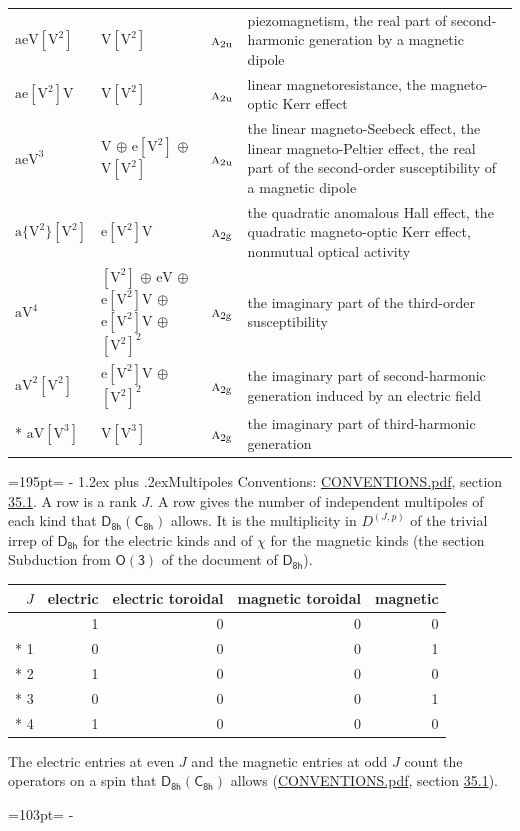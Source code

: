 \documentclass[10pt,a4paper]{article}
\makeatletter
\renewcommand\section{\@startsection{section}{1}{\z@}{-3ex plus -1ex minus -.2ex}%
  {1.2ex plus .2ex}{\normalfont\large\sffamily\bfseries\color{parttitle}}}
\newcommand{\needspace}[1]{\par\penalty-100\begingroup\dimen0=#1\relax\dimen2=\pagegoal
  \advance\dimen2-\pagetotal\ifdim\dimen0>\dimen2\relax\ifdim\dimen2>0pt\vfil\break\fi\fi
  \endgroup}
\numberwithin{equation}{section}
\newcommand{\grp}[1]{\mathsf{#1}}
\newcommand{\irr}[1]{\text{\normalfont\scshape #1}}
\newcommand{\ptag}[1]{\mathrm{#1}}
\newcommand{\irrJp}[2]{D^{(#1,#2)}}
\newcommand{\jahn}[1]{\mathrm{#1}}
\newlength{\fillwidth}\newlength{\cellwidth}\newlength{\colwidth}
\makeatother
\begin{document}
{\begin{longtable}{@{}lll>{\RaggedRight\arraybackslash}p{\fillwidth}@{}}
$\jahn{aeV[V^{2}]}$ & $\jahn{V[V^{2}]}$ & $\irr{a}_{2\ptag{u}}$ & piezomagnetism, the real part of second-harmonic generation by a magnetic dipole\\
$\jahn{ae[V^{2}]V}$ & $\jahn{V[V^{2}]}$ & $\irr{a}_{2\ptag{u}}$ & linear magnetoresistance, the magneto-optic Kerr effect\\
$\jahn{aeV^{3}}$ & $\jahn{V}$ $\oplus$ $\jahn{e[V^{2}]}$ $\oplus$ $\jahn{V[V^{2}]}$ & $\irr{a}_{2\ptag{u}}$ & the linear magneto-Seebeck effect, the linear magneto-Peltier effect, the real part of the second-order susceptibility of a magnetic dipole\\
$\jahn{a\{V^{2}\}[V^{2}]}$ & $\jahn{e[V^{2}]V}$ & $\irr{a}_{2\ptag{g}}$ & the quadratic anomalous Hall effect, the quadratic magneto-optic Kerr effect, nonmutual optical activity\\
$\jahn{aV^{4}}$ & $\jahn{[V^{2}]}$ $\oplus$ $\jahn{eV}$ $\oplus$ $\jahn{e[V^{2}]V}$ $\oplus$ $\jahn{e[V^{2}]V}$ $\oplus$ $\jahn{[V^{2}]^{2}}$ & $\irr{a}_{2\ptag{g}}$ & the imaginary part of the third-order susceptibility\\
$\jahn{aV^{2}[V^{2}]}$ & $\jahn{e[V^{2}]V}$ $\oplus$ $\jahn{[V^{2}]^{2}}$ & $\irr{a}_{2\ptag{g}}$ & the imaginary part of second-harmonic generation induced by an electric field\\*
$\jahn{aV[V^{3}]}$ & $\jahn{V[V^{3}]}$ & $\irr{a}_{2\ptag{g}}$ & the imaginary part of third-harmonic generation\\
\bottomrule\end{longtable}}
\needspace{195pt}
\section{Multipoles}\label{s:multipoles}
Conventions: \href{../../CONVENTIONS.pdf}{CONVENTIONS.pdf}, section \href{../../CONVENTIONS.pdf\#conv.35.1}{35.1}.
A row is a rank $J$. \label{n:head.multipole.electric}\label{n:head.multipole.electric.toroidal}\label{n:head.multipole.magnetic.toroidal}\label{n:head.multipole.magnetic}A row gives the number of independent multipoles of each kind that $\grp{D_{8h}}(\grp{C_{8h}})$ allows. It is the multiplicity in $\irrJp{J}{p}$ of the trivial irrep of $\grp{D_{8h}}$ for the electric kinds and of $\chi$ for the magnetic kinds (the section Subduction from $\grp{O(3)}$ of the document of \href{../../../rotation/data/pdf/D8h.pdf}{$\grp{D_{8h}}$}).
{\small\begin{longtable}{@{}rrrrr@{}}\toprule
$J$ & electric & electric toroidal & magnetic toroidal & magnetic\\\midrule\endhead
\bottomrule\endfoot\endlastfoot
0 & 1 & 0 & 0 & 0\\*
1 & 0 & 0 & 0 & 1\\*
2 & 1 & 0 & 0 & 0\\*
3 & 0 & 0 & 0 & 1\\*
4 & 1 & 0 & 0 & 0\\
\bottomrule\end{longtable}}
The electric entries at even $J$ and the magnetic entries at odd $J$ count the operators on a spin that $\grp{D_{8h}}(\grp{C_{8h}})$ allows (\href{../../CONVENTIONS.pdf}{CONVENTIONS.pdf}, section \href{../../CONVENTIONS.pdf\#conv.35.1}{35.1}).
\needspace{103pt}
\end{document}
